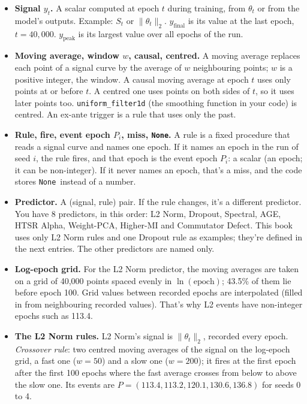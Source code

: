 \documentclass[11pt,a4paper,oneside,openany]{report}
\newcommand{\yfinal}{y_{\mathrm{final}}}
\newcommand{\ypeak}{y_{\mathrm{peak}}}
\newcommand{\None}{\texttt{None}}
\newcommand{\code}[1]{\texttt{#1}}
\newcommand{\gl}[1]{\textbf{#1}}   %
\newenvironment{glist}{\begin{itemize}\setlength{\itemsep}{2pt}\setlength{\parskip}{1pt}}{\end{itemize}}
\begin{document}
\begin{glist}
\item[\gl{N28}] \textbf{Signal $y_t$.} A scalar computed at epoch $t$ during training, from $\theta_t$ or from the model's outputs. Example: $S_t$ or $\lVert\theta_t\rVert_2$. $\yfinal$ is its value at the last epoch, $t = 40{,}000$. $\ypeak$ is its largest value over all epochs of the run.
\item[\gl{N29}] \textbf{Moving average, window $w$, causal, centred.} A moving average replaces each point of a signal curve by the average of $w$ neighbouring points; $w$ is a positive integer, the window. A causal moving average at epoch $t$ uses only points at or before $t$. A centred one uses points on both sides of $t$, so it uses later points too. \code{uniform\_\allowbreak{}filter1d} (the smoothing function in your code) is centred. An ex-ante trigger is a rule that uses only the past.
\item[\gl{N30}] \textbf{Rule, fire, event epoch $P_i$, miss, \None.} A rule is a fixed procedure that reads a signal curve and names one epoch. If it names an epoch in the run of seed $i$, the rule fires, and that epoch is the event epoch $P_i$: a scalar (an epoch; it can be non-integer). If it never names an epoch, that's a miss, and the code stores \None\ instead of a number.
\item[\gl{N31}] \textbf{Predictor.} A (signal, rule) pair. If the rule changes, it's a different predictor. You have 8 predictors, in this order: L2 Norm, Dropout, Spectral, AGE, HTSR Alpha, Weight-PCA, Higher-MI and Commutator Defect. This book uses only L2 Norm rules and one Dropout rule as examples; they're defined in the next entries. The other predictors are named only.
\item[\gl{N32}] \textbf{Log-epoch grid.} For the L2 Norm predictor, the moving averages are taken on a grid of 40{,}000 points spaced evenly in $\ln(\text{epoch})$; 43.5\% of them lie before epoch 100. Grid values between recorded epochs are interpolated (filled in from neighbouring recorded values). That's why L2 events have non-integer epochs such as 113.4.
\item[\gl{N33}] \textbf{The L2 Norm rules.} L2 Norm's signal is $\lVert\theta_t\rVert_2$, recorded every epoch.
\emph{Crossover rule}: two centred moving averages of the signal on the log-epoch grid, a fast one ($w = 50$) and a slow one ($w = 200$); it fires at the first epoch after the first 100 epochs where the fast average crosses from below to above the slow one. Its events are $P = (113.4, 113.2, 120.1, 130.6, 136.8)$ for seeds 0 to 4.

\end{glist}
\end{document}
